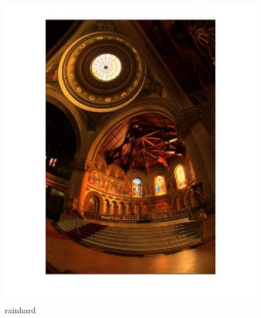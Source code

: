 {  \begin{figure}[!htb]
      	\includegraphics[width=\linewidth]{images/reinhardhdr1}
      	\caption{rainhard}\label{fig:logtonemap}
    \endminipage\hfill
   \end{figure}
      
}

